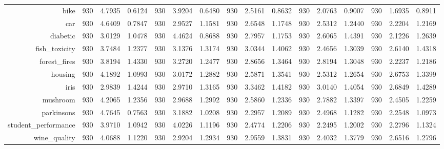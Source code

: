 \begin{table}[htbp]
{\begin{tabular}{rccccccccccccccc}
    bike  & 930   & 4.7935 & 0.6124 & 930   & 3.9204 & 0.6480 & 930   & 2.5161 & 0.8632 & 930   & 2.0763 & 0.9007 & 930   & \cellcolor[rgb]{ .776,  .937,  .808}\textcolor[rgb]{ 0,  .38,  0}{1.6935} & 0.8911 \\
    car   & 930   & 4.6409 & 0.7847 & 930   & 2.9527 & 1.1581 & 930   & 2.6548 & 1.1748 & 930   & 2.5312 & 1.2440 & 930   & \cellcolor[rgb]{ .776,  .937,  .808}\textcolor[rgb]{ 0,  .38,  0}{2.2204} & 1.2169 \\
    diabetic & 930   & 3.0129 & 1.0478 & 930   & 4.4624 & 0.8688 & 930   & 2.7957 & 1.1753 & 930   & 2.6065 & 1.4391 & 930   & \cellcolor[rgb]{ .776,  .937,  .808}\textcolor[rgb]{ 0,  .38,  0}{2.1226} & 1.2639 \\
    fish\_toxicity & 930   & 3.7484 & 1.2377 & 930   & 3.1376 & 1.3174 & 930   & 3.0344 & 1.4062 & 930   & \cellcolor[rgb]{ .776,  .937,  .808}\textcolor[rgb]{ 0,  .38,  0}{2.4656} & 1.3039 & 930   & 2.6140 & 1.4318 \\
    forest\_fires & 930   & 3.8194 & 1.4330 & 930   & 3.2720 & 1.2477 & 930   & 2.8656 & 1.3464 & 930   & 2.8194 & 1.3048 & 930   & \cellcolor[rgb]{ .776,  .937,  .808}\textcolor[rgb]{ 0,  .38,  0}{2.2237} & 1.2186 \\
    housing & 930   & 4.1892 & 1.0993 & 930   & 3.0172 & 1.2882 & 930   & 2.5871 & 1.3541 & 930   & \cellcolor[rgb]{ .776,  .937,  .808}\textcolor[rgb]{ 0,  .38,  0}{2.5312} & 1.2654 & 930   & 2.6753 & 1.3399 \\
    iris  & 930   & 2.9839 & 1.4244 & 930   & 2.9710 & 1.3165 & 930   & 3.3462 & 1.4182 & 930   & 3.0140 & 1.4054 & 930   & \cellcolor[rgb]{ .776,  .937,  .808}\textcolor[rgb]{ 0,  .38,  0}{2.6849} & 1.4289 \\
    mushroom & 930   & 4.2065 & 1.2356 & 930   & 2.9688 & 1.2992 & 930   & 2.5860 & 1.2336 & 930   & 2.7882 & 1.3397 & 930   & \cellcolor[rgb]{ .776,  .937,  .808}\textcolor[rgb]{ 0,  .38,  0}{2.4505} & 1.2259 \\
    parkinsons & 930   & 4.7645 & 0.7563 & 930   & 3.1882 & 1.0208 & 930   & 2.2957 & 1.2089 & 930   & 2.4968 & 1.1282 & 930   & \cellcolor[rgb]{ .776,  .937,  .808}\textcolor[rgb]{ 0,  .38,  0}{2.2548} & 1.0973 \\
    student\_performance & 930   & 3.9710 & 1.0942 & 930   & 4.0226 & 1.1196 & 930   & 2.4774 & 1.2206 & 930   & \cellcolor[rgb]{ .776,  .937,  .808}\textcolor[rgb]{ 0,  .38,  0}{2.2495} & 1.2002 & 930   & 2.2796 & 1.1324 \\
    wine\_quality & 930   & 4.0688 & 1.1220 & 930   & 2.9204 & 1.2934 & 930   & 2.9559 & 1.3831 & 930   & \cellcolor[rgb]{ .776,  .937,  .808}\textcolor[rgb]{ 0,  .38,  0}{2.4032} & 1.3779 & 930   & 2.6516 & 1.2796 \\

\end{tabular}}
\end{table}
